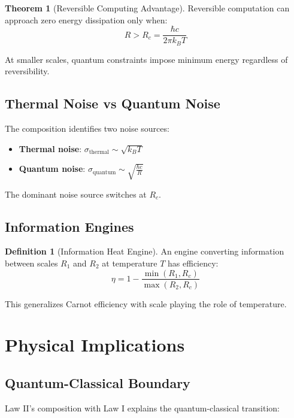 \documentclass[11pt,a4paper]{article}
\theoremstyle{definition}
\newtheorem{definition}{Definition}[section]
\newtheorem{theorem}{Theorem}[section]
\begin{document}
\begin{theorem}[Reversible Computing Advantage]
Reversible computation can approach zero energy dissipation only when:
\begin{equation}
R > R_c = \frac{\hbar c}{2\pi k_B T}
\end{equation}
\end{theorem}

At smaller scales, quantum constraints impose minimum energy regardless of reversibility.

\subsection{Thermal Noise vs Quantum Noise}

The composition identifies two noise sources:
\begin{itemize}
\item \textbf{Thermal noise}: $\sigma_{\text{thermal}} \sim \sqrt{k_B T}$
\item \textbf{Quantum noise}: $\sigma_{\text{quantum}} \sim \sqrt{\frac{\hbar c}{R}}$
\end{itemize}

The dominant noise source switches at $R_c$.

\subsection{Information Engines}

\begin{definition}[Information Heat Engine]
An engine converting information between scales $R_1$ and $R_2$ at temperature $T$ has efficiency:
\begin{equation}
\eta = 1 - \frac{\min(R_1, R_c)}{\max(R_2, R_c)}
\end{equation}
\end{definition}

This generalizes Carnot efficiency with scale playing the role of temperature.

\section{Physical Implications}

\subsection{Quantum-Classical Boundary}

Law II's composition with Law I explains the quantum-classical transition:
\end{document}
